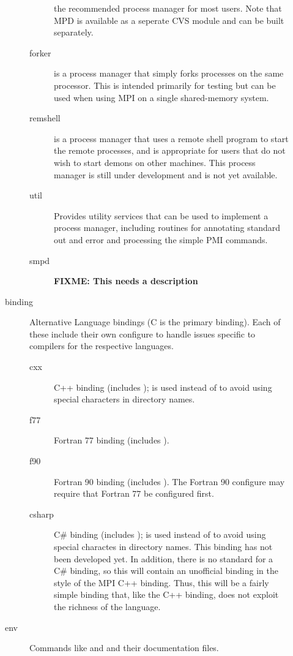 \documentclass{article}
\def\fixme#1{\marginpar{FIXME:}\textbf{FIXME: #1}}
\begin{document}
\begin{description}
\begin{description}
\begin{description}
        the recommended process manager for most users.
        Note that MPD is available as a seperate CVS module and can be
        built separately.
        \item[forker]is a process manager that simply forks processes
        on the same processor.  This is intended primarily for testing
        but can be used when using MPI on a single shared-memory system.
        \item[remshell]is a process manager that uses a remote shell
        program to start the remote processes, and is appropriate for
        users that do not wish to start demons on other machines.
        This process manager is still under development and is not
        yet available.
        \item[util]Provides utility services that can be used to
        implement a process manager, including routines for annotating
        standard out and error and processing the simple PMI commands.
        \item[smpd]\fixme{This needs a description}
        \end{description}

  \item[binding]Alternative Language bindings (C is the primary
  binding).
        Each of these include their own configure to handle issues
  specific to compilers for the respective languages.
    \begin{description}
    \item[cxx]C++ binding (includes );  is
    used instead of  to avoid using special characters in
    directory names.  
    \item[f77]Fortran 77 binding (includes ).
    \item[f90]Fortran 90 binding (includes ).
        The Fortran 90 configure may require that Fortran 77 be
  configured first.
    \item[csharp]C\# binding (includes );   is
    used instead of  to avoid using special charactes in
    directory names.  This binding has not been developed yet.  In
    addition, there is no standard for a C\# binding, so this will
    contain an unofficial binding in the style of the MPI C++
    binding.  Thus, this will be a fairly simple binding that, like
    the C++ binding, does not exploit the richness of the language.
    \end{description}
  \item[env]Commands like  and  and their
  documentation files.
  \end{description}
  


\end{description}
\end{document}
